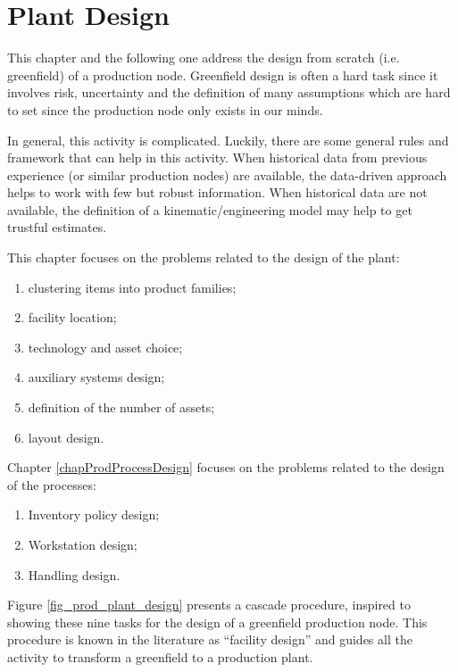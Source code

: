 \chapter{Plant Design} \label{chapProdPlantDesign}

This chapter and the following one address the design from scratch (i.e. greenfield) of a production node. Greenfield design is often a hard task since it involves risk, uncertainty and the definition of many assumptions which are hard to set since the production node only exists in our minds.\par

In general, this activity is complicated. Luckily, there are some general rules and framework that can help in this activity. When historical data from previous experience (or similar production nodes) are available, the data-driven approach helps to work with few but robust information. When historical data are not available, the definition of a kinematic/engineering model may help to get trustful estimates.\par

This chapter focuses on the problems related to the design of the plant:

\begin{enumerate}
    \item clustering items into product families;
    \item facility location;
    \item technology and asset choice;
    \item auxiliary systems design;
    \item definition of the number of assets;
    \item layout design.

\end{enumerate}

Chapter \ref{chapProdProcessDesign} focuses on the problems related to the design of the processes:

\begin{enumerate}
    \item Inventory policy design;
    \item Workstation design;
    \item Handling design.

\end{enumerate}

Figure \ref{fig_prod_plant_design} presents a cascade procedure, inspired to ~\cite{Heragu} showing these nine tasks for the design of a greenfield production node. This procedure is known in the literature as “facility design” and guides all the activity to transform a greenfield to a production plant.

